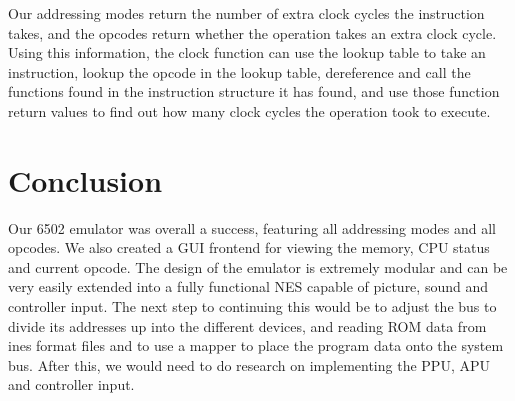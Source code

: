 \documentclass[12pt]{article}
\newcommand{\singlespace}{
  \protect\renewcommand\baselinestretch{1.0}
  \protect\normalsize
}
\begin{document}
Our addressing modes return the number of extra clock cycles the instruction takes, and the opcodes return
whether the operation takes an extra clock cycle. Using this information, the clock function can use the
lookup table to take an instruction, lookup the opcode in the lookup table, dereference and call the functions
found in the instruction structure it has found, and use those function return values to find out how many clock
cycles the operation took to execute.

\section{Conclusion}
\label{sec:conclution}

Our 6502 emulator was overall a success, featuring all addressing modes and all opcodes. We also created
a GUI frontend for viewing the memory, CPU status and current opcode. The design of the emulator is extremely 
modular and can be very easily extended into a fully functional NES capable of picture, sound and controller
input. The next step to continuing this would be to adjust the bus to divide its addresses up into the different
devices, and reading ROM data from ines format files and to use a mapper to place the program data onto the 
system bus. After this, we would need to do research on implementing the PPU, APU and controller input.


\singlespace




\end{document}
